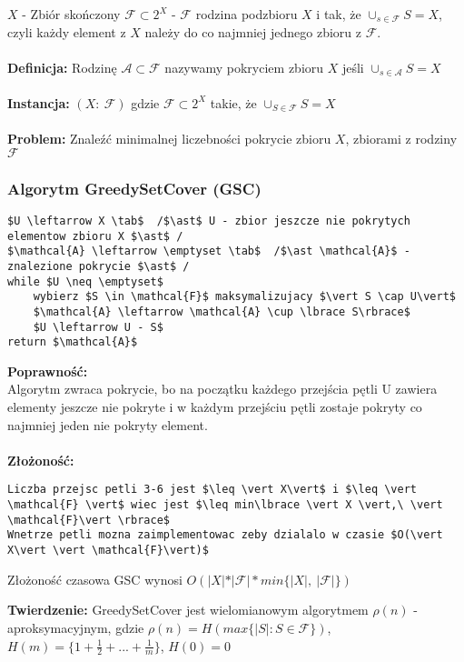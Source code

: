 $X$ - Zbiór skończony
$\mathcal{F} \subset 2^{X}$ - $\mathcal{F}$ rodzina podzbioru $X$ i tak, że $\cup_{s\in \mathcal{F}}S = X$, czyli każdy element z $X$ należy do co najmniej jednego zbioru z $\mathcal{F}$.\\
\\
\textbf{Definicja: }Rodzinę $\mathcal{A}\subset \mathcal{F}$ nazywamy pokryciem zbioru $X$ jeśli $\cup_{s\in \mathcal{A}}S = X$\\
\\
\textbf{Instancja: }$(X:\ \mathcal{F})$ gdzie $\mathcal{F} \subset 2^{X}$ takie, że $\cup_{S\in \mathcal{F}}S = X$\\
\\
\textbf{Problem: }Znaleźć minimalnej liczebności pokrycie zbioru $X$, zbiorami z rodziny $\mathcal{F}$
\subsubsection{Algorytm GreedySetCover (GSC)}
\begin{lstlisting}[caption={GreedySetCover(G)}]
$U \leftarrow X \tab$  /$\ast$ U - zbior jeszcze nie pokrytych elementow zbioru X $\ast$ /
$\mathcal{A} \leftarrow \emptyset \tab$  /$\ast \mathcal{A}$ - znalezione pokrycie $\ast$ /
while $U \neq \emptyset$
	wybierz $S \in \mathcal{F}$ maksymalizujacy $\vert S \cap U\vert$
	$\mathcal{A} \leftarrow \mathcal{A} \cup \lbrace S\rbrace$
	$U \leftarrow U - S$
return $\mathcal{A}$
\end{lstlisting}
\textbf{Poprawność: }\\
\tab Algorytm zwraca pokrycie, bo na początku każdego przejścia pętli U zawiera elementy jeszcze nie pokryte i w każdym przejściu pętli zostaje pokryty co najmniej jeden nie pokryty element.\\
\\
\textbf{Złożoność: }
\begin{lstlisting}
Liczba przejsc petli 3-6 jest $\leq \vert X\vert$ i $\leq \vert \mathcal{F} \vert$ wiec jest $\leq min\lbrace \vert X \vert,\ \vert \mathcal{F}\vert \rbrace$
Wnetrze petli mozna zaimplementowac zeby dzialalo w czasie $O(\vert X\vert \vert \mathcal{F}\vert)$
\end{lstlisting}
\begin{center}
Złożoność czasowa GSC wynosi $O(\vert X\vert \ast \vert\mathcal{F}\vert \ast min\lbrace \vert X \vert,\ \vert \mathcal{F}\vert \rbrace)$
\end{center}
\textbf{Twierdzenie: }GreedySetCover jest wielomianowym algorytmem $\rho(n)$ - aproksymacyjnym, gdzie $\rho(n) = H(max\lbrace\vert S\vert :S\in \mathcal{F}\rbrace)$, $H(m) = \lbrace 1 + \frac{1}{2} + ... +\frac{1}{m}\rbrace$, $H(0)=0$\\
